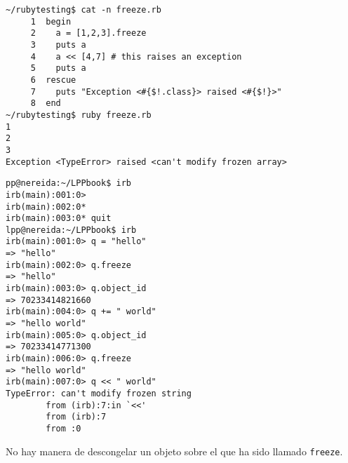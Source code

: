 \begin{verbatim}
~/rubytesting$ cat -n freeze.rb 
     1  begin
     2    a = [1,2,3].freeze
     3    puts a
     4    a << [4,7] # this raises an exception
     5    puts a
     6  rescue
     7    puts "Exception <#{$!.class}> raised <#{$!}>"
     8  end
~/rubytesting$ ruby freeze.rb 
1
2
3
Exception <TypeError> raised <can't modify frozen array>
\end{verbatim}

\begin{verbatim}
pp@nereida:~/LPPbook$ irb
irb(main):001:0> 
irb(main):002:0* 
irb(main):003:0* quit
lpp@nereida:~/LPPbook$ irb
irb(main):001:0> q = "hello"
=> "hello"
irb(main):002:0> q.freeze
=> "hello"
irb(main):003:0> q.object_id
=> 70233414821660
irb(main):004:0> q += " world"
=> "hello world"
irb(main):005:0> q.object_id
=> 70233414771300
irb(main):006:0> q.freeze
=> "hello world"
irb(main):007:0> q << " world"
TypeError: can't modify frozen string
        from (irb):7:in `<<'
        from (irb):7
        from :0
\end{verbatim}

No hay manera de descongelar un objeto sobre el que ha sido llamado 
\verb|freeze|.

